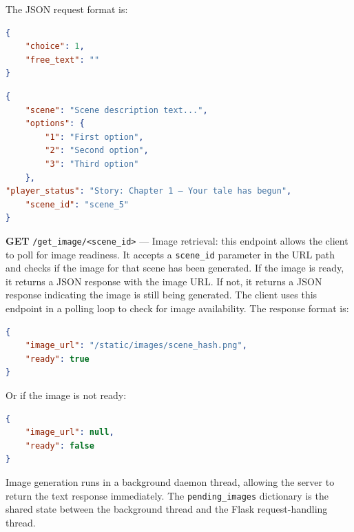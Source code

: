 \documentclass[12pt,a4paper]{article}
\newcommand{\breakablegetimage}[1]{\texttt{/get\_image/}\allowbreak\texttt{#1}}
\begin{document}
    The JSON request format is:

    \begin{lstlisting}[language=JSON, caption={Request format for /make\_choice endpoint}, basicstyle=\ttfamily\footnotesize, showspaces=false, showstringspaces=false]
{
    "choice": 1,
    "free_text": ""
}
    \end{lstlisting}\nopagebreak[4]
    \begin{lstlisting}[language=JSON, caption={Response format from /make\_choice endpoint}, basicstyle=\ttfamily\footnotesize, showspaces=false, showstringspaces=false]
{
    "scene": "Scene description text...",
    "options": {
        "1": "First option",
        "2": "Second option",
        "3": "Third option"
    },
"player_status": "Story: Chapter 1 — Your tale has begun",
    "scene_id": "scene_5"
}
    \end{lstlisting}

\textbf{GET} \breakablegetimage{<scene\_id>} --- Image retrieval: this endpoint allows the client to poll for image readiness. It accepts a \texttt{scene\_id} parameter in the URL path and checks if the image for that scene has been generated. If the image is ready, it returns a JSON response with the image URL. If not, it returns a JSON response indicating the image is still being generated. The client uses this endpoint in a polling loop to check for image availability. The response format is:

    \begin{lstlisting}[language=JSON, caption={Response format from /get\_image endpoint}, basicstyle=\ttfamily\footnotesize, showspaces=false, showstringspaces=false]
{
    "image_url": "/static/images/scene_hash.png",
    "ready": true
}
    \end{lstlisting}\nopagebreak[4]
    Or if the image is not ready:

    \begin{lstlisting}[language=JSON, caption={Response when image is not ready}, basicstyle=\ttfamily\footnotesize, showspaces=false, showstringspaces=false]
{
    "image_url": null,
    "ready": false
}
\end{lstlisting}\nopagebreak[4]
Image generation runs in a background daemon thread, allowing the server to return the text response immediately. The \texttt{pending\_images} dictionary is the shared state between the background thread and the Flask request-handling thread.
\end{document}
